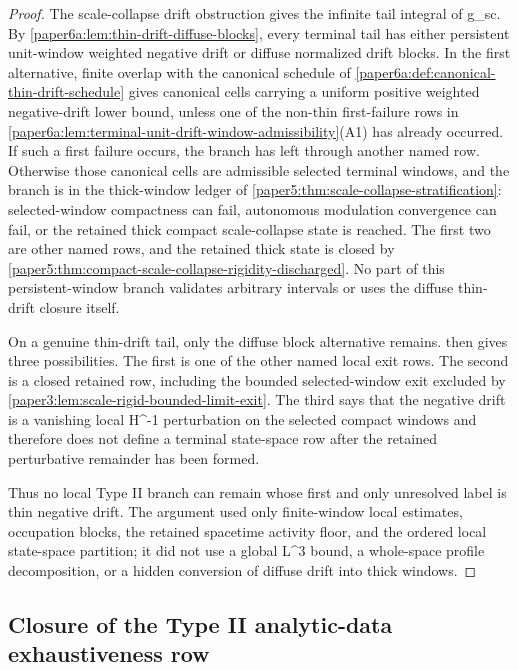 \documentclass[11pt]{amsart}
\def\({}%
\def\){}%
\theoremstyle{plain}
\theoremstyle{definition}
\theoremstyle{remark}
\begin{document}
\begin{proof}
The scale-collapse drift obstruction gives the infinite tail integral of
\(g_{\rm sc}\).  By
\cref{paper6a:lem:thin-drift-diffuse-blocks}, every terminal tail has either
persistent unit-window weighted negative drift or diffuse normalized drift
blocks.  In the first alternative, finite overlap with the canonical schedule
of \cref{paper6a:def:canonical-thin-drift-schedule} gives canonical cells
carrying a uniform positive weighted negative-drift lower bound, unless one of
the non-thin first-failure rows in
\cref{paper6a:lem:terminal-unit-drift-window-admissibility}\textup{(A1)} has
already occurred.  If such a first failure occurs, the branch has left through
another named row.  Otherwise those canonical cells are admissible selected
terminal windows, and the branch is in the thick-window ledger of
\cref{paper5:thm:scale-collapse-stratification}: selected-window compactness
can fail, autonomous modulation convergence can fail, or the retained thick
compact scale-collapse state is reached.  The first two are other named rows,
and the retained thick state is closed by
\cref{paper5:thm:compact-scale-collapse-rigidity-discharged}.  No part of this
persistent-window branch validates arbitrary intervals or uses the diffuse
thin-drift closure itself.
\par
On a genuine thin-drift tail, only the diffuse block alternative remains.
 then gives three possibilities.
The first is one of the other named local exit rows.  The second is a closed
retained row, including the bounded selected-window exit excluded by
\cref{paper3:lem:scale-rigid-bounded-limit-exit}.  The third says that the
negative drift is a vanishing local \(H^{-1}\) perturbation on the selected
compact windows and therefore does not define a terminal state-space row after
the retained perturbative remainder has been formed.
\par
Thus no local Type II branch can remain whose first and only unresolved label
is thin negative drift.  The argument used only finite-window local estimates,
occupation blocks, the retained spacetime activity floor, and the ordered local
state-space partition; it did not use a global \(L^3\) bound, a whole-space
profile decomposition, or a hidden conversion of diffuse drift into thick
windows.
\end{proof}

\subsection{Closure of the Type II analytic-data exhaustiveness row}
\label{paper6a:subsec:discharge-typeII-analytic-data}
\end{document}
